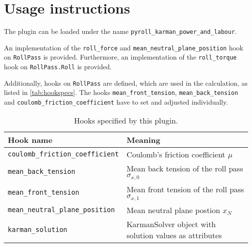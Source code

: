 \documentclass[11pt]{PyRollDocs}
\begin{document}
    \section{Usage instructions}\label{sec:usage-instructions}
    The plugin can be loaded under the name \texttt{pyroll\_karman\_power\_and\_labour}.

    An implementation of the \lstinline{roll_force} and \lstinline{mean_neutral_plane_position} hook on \lstinline{RollPass} is provided.
    Furthermore, an implementation of the \lstinline{roll_torque} hook on \lstinline{RollPass.Roll} is provided.

    Additionally, hooks on \lstinline{RollPass} are defined, which are used in the calculation, as listed in \autoref{tab:hookspecs}.
    The hooks \lstinline{mean_front_tension}, \lstinline{mean_back_tension} and \lstinline{coulomb_friction_coefficient} have to set and adjusted individually.

    \begin{table}
        \centering
        \caption{Hooks specified by this plugin.}
        \label{tab:hookspecs}
        \begin{tabular}{ll}
            \toprule
            Hook name                               & Meaning                                                \\
            \midrule
            \texttt{coulomb\_friction\_coefficient} & Coulomb's friction coefficient $\mu$                   \\
            \texttt{mean\_back\_tension}            & Mean back tension of the roll pass $\sigma_{x,0}$      \\
            \texttt{mean\_front\_tension}           & Mean front tension of the roll pass $\sigma_{x,1}$     \\
            \texttt{mean\_neutral\_plane\_position} & Mean neutral plane postion $x_N$                       \\
            \texttt{karman\_solution}               & KarmanSolver object with solution values as attributes \\
            \bottomrule
        \end{tabular}
    \end{table}

    \printbibliography
\end{document}
